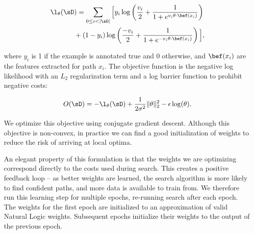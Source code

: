 \vspace{-0.75em}
\begin{align*}
\l_\theta(\sD&) = \sum_{0 \leq i < |\sD|} \Big[
    y_i \log \left(\frac{v_i}{2} + \frac{1}{1 + e^{v_i \theta \cdot \bef(x_i)}} \right) \\
    &+ (1 - y_i) \log \left(\frac{-v_i}{2} + \frac{1}{1 + e^{-v_i \theta \cdot \bef(x_i)}} \right)
  \Big],
\end{align*}
\vspace{-1.0em}

\noindent where $y_i$ is 1 if the example is annotated true and 0
  otherwise, and $\bef(x_i)$ are the features extracted for path $x_i$.
The objective function is the negative log likelihood with
  an $L_2$ regularization term and a log barrier function to 
  prohibit negative costs:

\vspace{-1.0em}
\begin{equation*}
O(\sD) = -\l_\theta(\sD) 
  + \frac{1}{2 \sigma^2}\|\theta\|_2^2
  - \epsilon \log(\theta).
\end{equation*}
\vspace{-1.0em}

We optimize this objective using conjugate gradient descent.
Although this objective is non-convex, in practice we can find a good
  initialization of weights to reduce the risk of arriving at
  local optima.

An elegant property of this formulation is that the weights we are
  optimizing correspond directly to the costs used during search.
This creates a positive feedback loop -- as better weights are learned,
  the search algorithm is more likely to find confident paths, and
  more data is available to train from.
We therefore run this learning step for multiple epochs,
  re-running search after each epoch.
The weights for the first epoch are initialized to an approximation
  of valid Natural Logic weights.
Subsequent epochs initialize their weights to the output of the previous
  epoch.






